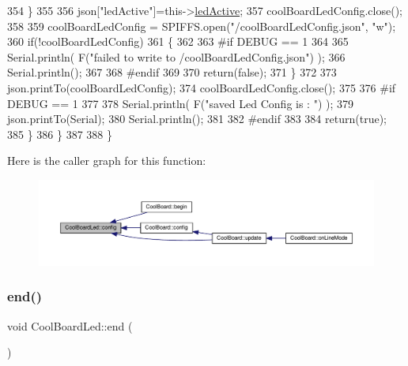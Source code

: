 \begin{DoxyCode}
354             \}
355             
356             json[\textcolor{stringliteral}{"ledActive"}]=this->\hyperlink{classCoolBoardLed_a5f17c135516fcf4b44ea8a096ba0177a}{ledActive};
357             coolBoardLedConfig.close();
358             
359             coolBoardLedConfig = SPIFFS.open(\textcolor{stringliteral}{"/coolBoardLedConfig.json"}, \textcolor{stringliteral}{"w"});
360             \textcolor{keywordflow}{if}(!coolBoardLedConfig)
361             \{
362             
363 \textcolor{preprocessor}{            #if DEBUG == 1 }
364 
365                 Serial.println( F(\textcolor{stringliteral}{"failed to write to /coolBoardLedConfig.json"}) );
366                 Serial.println();
367 
368 \textcolor{preprocessor}{            #endif}
369 
370                 \textcolor{keywordflow}{return}(\textcolor{keyword}{false});          
371             \}
372 
373             json.printTo(coolBoardLedConfig);
374             coolBoardLedConfig.close();
375 
376 \textcolor{preprocessor}{        #if DEBUG == 1}
377     
378             Serial.println( F(\textcolor{stringliteral}{"saved Led Config is : "}) );
379             json.printTo(Serial);
380             Serial.println();
381 
382 \textcolor{preprocessor}{        #endif}
383 
384             \textcolor{keywordflow}{return}(\textcolor{keyword}{true}); 
385         \}
386     \}   
387 
388 \}               
\end{DoxyCode}
Here is the caller graph for this function\+:
\nopagebreak
\begin{figure}[H]
\begin{center}
\leavevmode
\includegraphics[width=350pt]{classCoolBoardLed_a1b60e5e30bea96c49ed62ed1bf1ffc8b_icgraph}
\end{center}
\end{figure}
\mbox{\label{classCoolBoardLed_a69f323359e0c9f797422f2152b5d41ef}} 
\subsubsection{\texorpdfstring{end()}{end()}}
{\footnotesize\ttfamily void Cool\+Board\+Led\+::end (\begin{DoxyParamCaption}{ }\end{DoxyParamCaption})}

